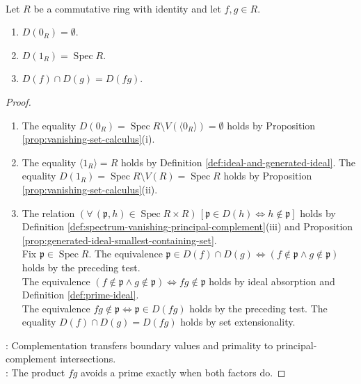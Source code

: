 \begin{proposition} \label{prop:principal-complement-calculus} \\
Let $R$ be a commutative ring with identity and let $f,g\in R$.
\begin{enumerate}[label=(\roman*)]
\setlength{\itemsep}{0pt}
\item $D(0_R)=\emptyset$.
\item $D(1_R)=\operatorname{Spec}R$.
\item $D(f)\cap D(g)=D(fg)$.
\end{enumerate}
\begin{proof}
\begin{enumerate}[label=(\roman*)]
\setlength{\itemsep}{0pt}
\item The equality $D(0_R)=\operatorname{Spec}R\setminus V(\langle0_R\rangle)=\emptyset$ holds by Proposition \ref{prop:vanishing-set-calculus}(i).
\item The equality $\langle1_R\rangle=R$ holds by Definition \ref{def:ideal-and-generated-ideal}. The equality $D(1_R)=\operatorname{Spec}R\setminus V(R)=\operatorname{Spec}R$ holds by Proposition \ref{prop:vanishing-set-calculus}(ii).
\item The relation $(\forall\,(\mathfrak{p},h)\in\operatorname{Spec}R\times R)\,[\mathfrak{p}\in D(h)\Longleftrightarrow h\notin\mathfrak{p}]$ holds by Definition \ref{def:spectrum-vanishing-principal-complement}(iii) and Proposition \ref{prop:generated-ideal-smallest-containing-set}.\\
Fix $\mathfrak{p}\in\operatorname{Spec}R$. The equivalence $\mathfrak{p}\in D(f)\cap D(g)\Longleftrightarrow(f\notin\mathfrak{p}\land g\notin\mathfrak{p})$ holds by the preceding test.\\
The equivalence $(f\notin\mathfrak{p}\land g\notin\mathfrak{p})\Longleftrightarrow fg\notin\mathfrak{p}$ holds by ideal absorption and Definition \ref{def:prime-ideal}.\\
The equivalence $fg\notin\mathfrak{p}\Longleftrightarrow\mathfrak{p}\in D(fg)$ holds by the preceding test. The equality $D(f)\cap D(g)=D(fg)$ holds by set extensionality.
\end{enumerate}
: Complementation transfers boundary values and primality to principal-complement intersections.\\
: The product $fg$ avoids a prime exactly when both factors do.
\end{proof}
\end{proposition}

